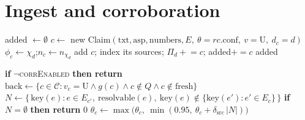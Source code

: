 \documentclass[11pt]{article}
\newcommand{\Claims}{\mathcal{C}}
\newcommand{\Queue}{Q}
\newcommand{\grad}{g}
\begin{document}
\section{Ingest and corroboration}

\begin{algorithm}[H]
\caption{\textsc{Ingest}$(\text{rawClaims}, d)$ — add claims with provenance and lineage (Component F)}\label{alg:ingest}
\begin{algorithmic}[1]
\State added $\gets\emptyset$
   \State $c\gets$ new Claim$(\mathrm{txt},\mathrm{asp},\mathrm{numbers},E,\ \theta{=}rc.\text{conf},\ v{=}\mathrm{U},\ d_c{=}d)$
   \If{$\chi_d\neq\bot\ \wedge\ \chi_d\in\Claims$} 
      \State $\phi_c\gets\chi_d$;\quad $n_c\gets n_{\chi_d}$ 
   \EndIf
   \State add $c$; index its sources; $\Pi_d\mathrel{+}=c$; added$\mathrel{+}=c$
\EndFor
\State \Return added
\end{algorithmic}
\end{algorithm}

\begin{algorithm}[H]
\caption{\textsc{RescoreCorroboration}(fresh) and \textsc{Corroborate} (Component B/C — the resurfacing driver)}\label{alg:corr}
\begin{algorithmic}[1]
\State \textbf{if} $\neg$\textsc{corrEnabled} \textbf{then return}
\State $\mathrm{back}\gets\{c\in\Claims:v_c=\mathrm{U}\wedge\grad(c)\wedge c\notin\Queue\wedge c\notin\mathrm{fresh}\}$
\ForAll{$c'\in\mathrm{fresh}$ with $\grad(c')$}
    
      \State {}
   \EndFor
\EndFor
\Statex\hrulefill
{}
   \State $N\gets\{\,\mathrm{key}(e):e\in E_{c'},\ \mathrm{resolvable}(e),\ \mathrm{key}(e)\notin\{\mathrm{key}(e'):e'\in E_c\}\,\}$
   \State \textbf{if} $N=\emptyset$ \textbf{then return} $0$ 
   \State $\theta_c\gets\max\!\big(\theta_c,\ \min(0.95,\ \theta_c+\delta_{\mathrm{src}}\,|N|)\big)$ 
\EndFunction
\end{algorithmic}
\end{algorithm}
\end{document}
